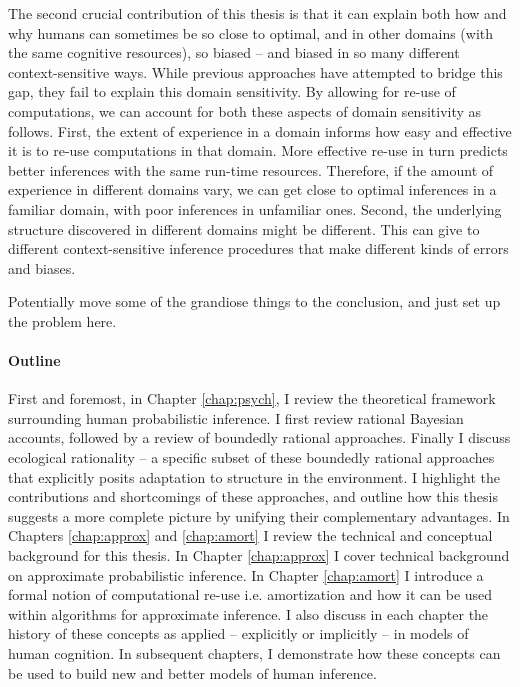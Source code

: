 The second crucial contribution of this thesis is that it can explain both how and why humans can sometimes be so close to optimal, and in other domains (with the same cognitive resources), so biased -- and biased in so many different context-sensitive ways. While previous approaches have attempted to bridge this gap, they fail to explain this domain sensitivity. By allowing for re-use of computations, we can account for both these aspects of domain sensitivity as follows. First, the extent of experience in a domain informs how easy and effective it is to re-use computations in that domain. More effective re-use in turn predicts better inferences with the same run-time resources. Therefore, if the amount of experience in different domains vary, we can get close to optimal inferences in a familiar domain, with poor inferences in unfamiliar ones. Second, the underlying structure discovered in different domains might be different. This can give to different context-sensitive inference procedures that make different kinds of errors and biases.

Potentially move some of the grandiose things to the conclusion, and just set up the problem here.


\paragraph{Outline}

First and foremost, in Chapter \ref{chap:psych}, I review the theoretical framework surrounding human probabilistic inference. I first review rational Bayesian accounts, followed by a review of boundedly rational approaches. Finally I discuss ecological rationality -- a specific subset of these boundedly rational approaches that explicitly posits adaptation to structure in the environment. I highlight the contributions and shortcomings of these approaches, and outline how this thesis suggests a more complete picture by unifying their complementary advantages. In Chapters \ref{chap:approx} and \ref{chap:amort} I review the technical and conceptual background for this thesis. In Chapter \ref{chap:approx} I cover technical background on approximate probabilistic inference. In Chapter \ref{chap:amort} I introduce a formal notion of computational re-use i.e. amortization and how it can be used within algorithms for approximate inference. I also discuss in each chapter the history of these concepts as applied -- explicitly or implicitly -- in models of human cognition. In subsequent chapters, I demonstrate how these concepts can be used to build new and better models of human inference.

